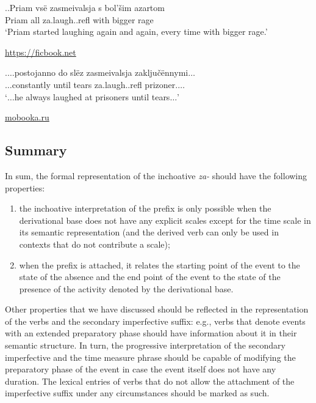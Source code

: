 \ex.\label{ex:za:laugh}\ag.\label{ex:za:laugh1}Priam vs\"{e} zasmeivalsja s bol'\v{s}im azartom\\
Priam all za.laugh..refl with bigger rage\\
\vspace{0.5em}
`Priam started laughing again and again, every time with bigger rage.'
\begin{flushright}
\vspace{-0.5em}
\url{https://ficbook.net}
\end{flushright}
\bg.\label{ex:za:laugh2}$\ldots$postojanno do sl\"{e}z zasmeivalsja zaklju\v{c}\"{e}nnymi$\ldots$\\
$\ldots$constantly until tears za.laugh..refl prizoner.$\ldots$\\
\vspace{0.5em}
`$\ldots$he always laughed at prisoners until tears$\ldots$'
\begin{flushright}
\vspace{-0.5em}
\url{mobooka.ru}
\end{flushright}

\subsection{Summary}
In sum, the formal representation of the inchoative \textit{za-} should have the following properties: 
\begin{enumerate}
\item the inchoative interpretation of the prefix is only possible when the derivational base does not have any explicit scales except for the time scale in its semantic representation (and the derived verb can only be used in contexts that do not contribute a scale);
\item when the prefix is attached, it relates the starting point of the event to the state of the absence and the end point of the event to the state of the presence of the activity denoted by the derivational base.
\end{enumerate}

Other properties that we have discussed should be reflected in the representation of the verbs and the secondary imperfective suffix: e.g., verbs that denote events with an extended preparatory phase should have information about it in their semantic structure. In turn, the progressive interpretation of the secondary imperfective and the time measure phrase should be capable of modifying the preparatory phase of the event in case the event itself does not have any duration. The lexical entries of verbs that do not allow the attachment of the imperfective suffix under any circumstances should be marked as such.


